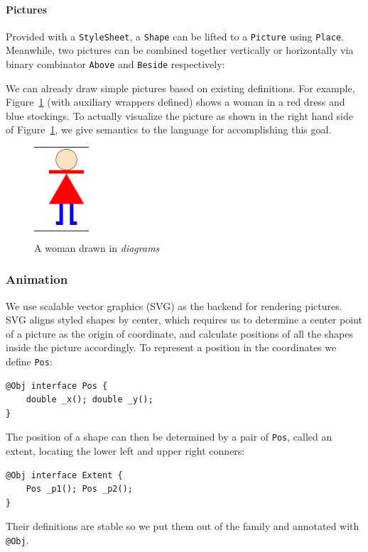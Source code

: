 \paragraph{Pictures}
Provided with a \texttt{StyleSheet}, a \texttt{Shape} can be lifted to a
\texttt{Picture} using \texttt{Place}. Meanwhile, two pictures can be
combined together vertically or horizontally via binary combinator
\texttt{Above} and \texttt{Beside} respectively:


We can already draw simple pictures based on existing definitions.
For example, Figure~\ref{woman} (with auxiliary wrappers defined) shows
a woman in a red dress and blue stockings.
To actually visualize the picture as shown in the right hand side of
Figure~\ref{woman}, we give semantics to the language for accomplishing this goal.

\begin{figure}
  \begin{tabular}{lr}
\begin{minipage}[t]{.9\textwidth}
\end{minipage}
&
\begin{minipage}[t]{.1\textwidth}
  \vspace{0.2em}
\includegraphics[width=1.3cm]{woman.png}
\end{minipage} \\
\end{tabular}
\caption{A woman drawn in \emph{diagrams}}
\label{woman}
\end{figure}

\subsubsection{Animation}
We use scalable vector graphics (SVG) as the backend for rendering
pictures.
SVG aligns styled shapes by center, which requires us to determine a center
point of a picture as the origin of coordinate, and calculate
positions of all the shapes inside the picture accordingly.
To represent a position in the coordinates we define \texttt{Pos}:
\begin{lstlisting}
@Obj interface Pos {
    double _x(); double _y();
}
\end{lstlisting}
The position of a shape can then be determined by a pair of \texttt{Pos}, called
an extent,
locating the lower left and upper right conners:
\begin{lstlisting}
@Obj interface Extent {
    Pos _p1(); Pos _p2();
}
\end{lstlisting}
Their definitions are stable so we put them out of the family and annotated
with \texttt{@Obj}.

